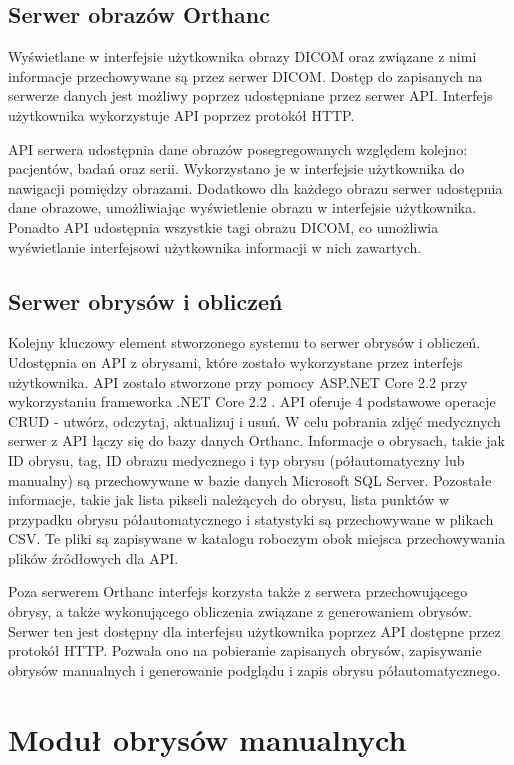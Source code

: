 \documentclass[a4paper,11pt,twoside,openright]{report}
\theoremstyle{definition}
\begin{document}
\subsection {Serwer obrazów Orthanc}

Wyświetlane w interfejsie użytkownika obrazy DICOM oraz związane z nimi informacje
przechowywane są przez serwer DICOM. Dostęp do zapisanych na serwerze danych jest
możliwy poprzez udostępniane przez serwer API. Interfejs użytkownika wykorzystuje
API poprzez protokół HTTP.

API serwera udostępnia dane obrazów posegregowanych względem kolejno: pacjentów,
badań oraz serii. Wykorzystano je w interfejsie użytkownika do nawigacji pomiędzy
obrazami. Dodatkowo dla każdego obrazu serwer udostępnia dane obrazowe, umożliwiając
wyświetlenie obrazu w interfejsie użytkownika. Ponadto API udostępnia wszystkie
tagi obrazu DICOM, co umożliwia wyświetlanie interfejsowi użytkownika informacji
w nich zawartych.

\subsection {Serwer obrysów i obliczeń}
Kolejny kluczowy element stworzonego systemu to serwer obrysów i obliczeń. Udostępnia
on API z obrysami, które zostało wykorzystane przez interfejs użytkownika. API zostało
stworzone przy pomocy ASP.NET Core 2.2 \cite{ASPNET} przy wykorzystaniu frameworka
.NET Core 2.2 \cite{Charakterystyka dotnet}. API oferuje 4 podstawowe operacje CRUD
- utwórz, odczytaj, aktualizuj i usuń. W celu pobrania zdjęć medycznych serwer z API
łączy się do bazy danych Orthanc. Informacje o obrysach, takie jak ID obrysu, tag,
ID obrazu medycznego i typ obrysu (półautomatyczny lub manualny) są przechowywane
w bazie danych Microsoft SQL Server. Pozostałe informacje, takie jak lista pikseli
należących do obrysu, lista punktów w przypadku obrysu półautomatycznego i statystyki
są przechowywane w plikach CSV. Te pliki są zapisywane w katalogu roboczym obok
miejsca przechowywania plików źródłowych dla API.

Poza serwerem Orthanc interfejs korzysta także z serwera przechowującego obrysy,
a także wykonującego obliczenia związane z generowaniem obrysów. Serwer ten jest
dostępny dla interfejsu użytkownika poprzez API dostępne przez protokół HTTP.
Pozwala ono na pobieranie zapisanych obrysów, zapisywanie obrysów manualnych i
generowanie podglądu i zapis obrysu półautomatycznego.

\section {Moduł obrysów manualnych}
\end{document}

